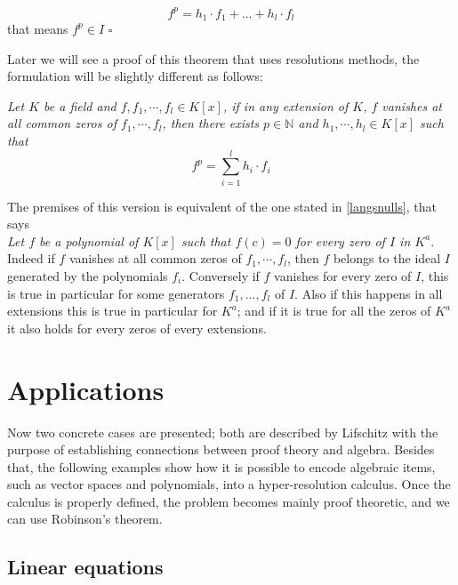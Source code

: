 \documentclass[a4paper,12pt,oneside]{book}
\newcommand*{\QED}{\hfill\ensuremath{\square}}
\begin{document}
$$ f^p= h_1\cdot f_1 + ...+ h_l\cdot f_l   $$
that means $f^p\in I$  \QED

\noindent Later we will see a proof of this theorem that uses resolutions methods, the formulation will be slightly different as follows:

\noindent\textit{Let $K$ be a field and $f,f_1,\cdots, f_l \in K[{x}]$, if in any extension of $K$, $f$ vanishes at all common zeros of $f_1,\cdots, f_l$, then there exists $p\in \mathbb{N}$ and $h_1,\cdots, h_l \in K[{x}]$ such that} 
$$
f^p = \sum_{i=1}^l h_i \cdot f_i
$$

\noindent The premises of this version is equivalent of the one stated in \ref{langsnulls}, that says\\ \textit{Let $f$ be a polynomial of $K[x]$ such that $f(c)=0$ for every zero of $I$ in $K^a$}.
 Indeed if $f$ vanishes at all common zeros of $f_1,\cdots, f_l$, then $f$ belongs to the ideal $I$ generated by the polynomials  $f_i$. Conversely if $f$ vanishes for every zero of $I$, this is true in particular for some generators $f_1,...,f_l$ of $I$. Also if this happens in all extensions this is true in particular for $K^a$; and if it is true for all the zeros of $K^a$ it also holds for every zeros of every extensions.


\section{Applications}
Now two concrete cases are presented; both are described by Lifschitz \cite{lifschitz} with the purpose of establishing connections between proof theory and algebra. Besides that, the following examples show how it is possible to encode algebraic items, such as vector spaces and polynomials, into a hyper-resolution calculus. Once the calculus is properly defined, the problem becomes mainly proof theoretic, and we can use Robinson's theorem.


\subsection*{Linear equations}
 
\end{document}

